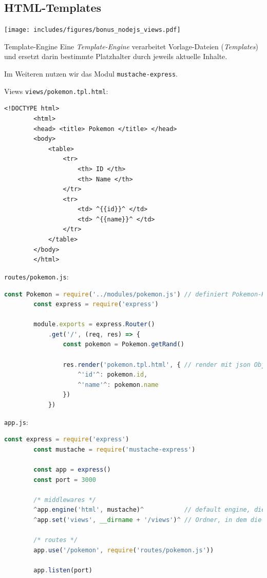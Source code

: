 \subsection{HTML-Templates}

\begin{center}
    \texttt{[image: includes/figures/bonus\_nodejs\_views.pdf]}
\end{center}

\begin{defi}{Template-Engine}
    Eine \emph{Template-Engine} verarbeitet Vorlage-Dateien (\emph{Templates}) und ersetzt darin bestimmte Platzhalter durch jeweils aktuelle Inhalte.

    Im Weiteren nutzen wir das Modul \texttt{mustache-express}.
\end{defi}

\begin{example}{Views}
    \texttt{views/pokemon.tpl.html}:
    \begin{lstlisting}[language=HTML5]
        <!DOCTYPE html>
        <html>
        <head> <title> Pokemon </title> </head>
        <body>
            <table>
                <tr> 
                    <th> ID </th> 
                    <th> Name </th> 
                </tr>
                <tr> 
                    <td> ^{{id}}^ </td> 
                    <td> ^{{name}}^ </td> 
                </tr>
            </table>
        </body>
        </html>
    \end{lstlisting}

    \texttt{routes/pokemon.js}:
    \begin{lstlisting}[language=JavaScript]
        const Pokemon = require('../modules/pokemon.js') // definiert Pokemon-Klasse
        const express = require('express')
        
        module.exports = express.Router()
            .get('/', (req, res) => {
                const pokemon = Pokemon.getRand()

                res.render('pokemon.tpl.html', { // render mit json Objekt, key -> Platzhalter
                    ^'id'^: pokemon.id,
                    ^'name'^: pokemon.name 
                })
            })
    \end{lstlisting}

    \texttt{app.js}:
    \begin{lstlisting}[language=JavaScript]
        const express = require('express')
        const mustache = require('mustache-express')

        const app = express()
        const port = 3000

        /* middlewares */
        ^app.engine('html', mustache)^           // default engine, die von res.render() genutzt wird
        ^app.set('views', __dirname + '/views')^ // Ordner, in dem die engine nach html Dateien sucht

        /* routes */
        app.use('/pokemon', require('routes/pokemon.js'))
        
        app.listen(port)
    \end{lstlisting}
\end{example}